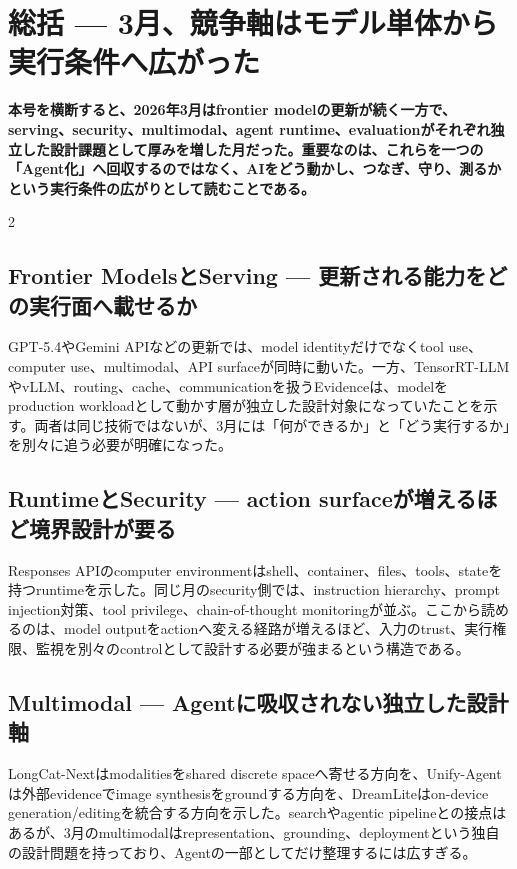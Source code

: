 \section{総括 — 3月、競争軸はモデル単体から実行条件へ広がった}
\label{sec:retrospective-synthesis}
\noindent\textbf{本号を横断すると、2026年3月はfrontier modelの更新が続く一方で、serving、security、multimodal、agent runtime、evaluationがそれぞれ独立した設計課題として厚みを増した月だった。重要なのは、これらを一つの「Agent化」へ回収するのではなく、AIをどう動かし、つなぎ、守り、測るかという実行条件の広がりとして読むことである。}
\medskip
\begin{multicols}{2}
\subsection{Frontier ModelsとServing — 更新される能力をどの実行面へ載せるか}
GPT-5.4やGemini APIなどの更新では、model identityだけでなくtool use、computer use、multimodal、API surfaceが同時に動いた。一方、TensorRT-LLMやvLLM、routing、cache、communicationを扱うEvidenceは、modelをproduction workloadとして動かす層が独立した設計対象になっていたことを示す。両者は同じ技術ではないが、3月には「何ができるか」と「どう実行するか」を別々に追う必要が明確になった。 \cite{src-eea6230f612a,src-a24fd97eb3d0,src-7e670bf82538,src-d6cda62f02bb}

\subsection{RuntimeとSecurity — action surfaceが増えるほど境界設計が要る}
Responses APIのcomputer environmentはshell、container、files、tools、stateを持つruntimeを示した。同じ月のsecurity側では、instruction hierarchy、prompt injection対策、tool privilege、chain-of-thought monitoringが並ぶ。ここから読めるのは、model outputをactionへ変える経路が増えるほど、入力のtrust、実行権限、監視を別々のcontrolとして設計する必要が強まるという構造である。 \cite{src-01572b4c34e9,src-18b7ee4fe5e4,src-3dec299964e6,src-5becf449a527}

\subsection{Multimodal — Agentに吸収されない独立した設計軸}
LongCat-Nextはmodalitiesをshared discrete spaceへ寄せる方向を、Unify-Agentは外部evidenceでimage synthesisをgroundする方向を、DreamLiteはon-device generation/editingを統合する方向を示した。searchやagentic pipelineとの接点はあるが、3月のmultimodalはrepresentation、grounding、deploymentという独自の設計問題を持っており、Agentの一部としてだけ整理するには広すぎる。 \cite{src-ac36472a8f09,src-197775677c0d,src-b8369fd2c988}


\end{multicols}
